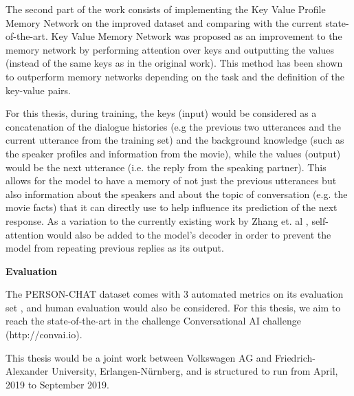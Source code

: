 \documentclass{article}
\begin{document}
	The second part of the work consists of implementing the Key Value Profile Memory Network \cite{miller2016key} on the improved dataset and comparing with the current state-of-the-art. Key Value Memory Network was proposed as an improvement to the memory network by performing attention over keys and outputting the values (instead of the same keys as in the original work). This method has been shown to outperform memory networks depending on the task and the definition of the key-value pairs.
	
	For this thesis, during training, the keys (input) would be considered as a concatenation of the dialogue histories (e.g the previous two utterances and the current utterance from the training set) and the background knowledge (such as the speaker profiles and information from the movie), while the values (output) would be the next utterance (i.e. the reply from the speaking partner). This allows for the model to have a memory of not just the previous utterances but also information about the speakers and about the topic of conversation (e.g. the movie facts) that it can directly use to help influence its prediction of the next response. As a variation to the currently existing work by Zhang et. al \cite{zhang2018personalizing}, self-attention would also be added to the model's decoder \cite{vaswani2017attention,shao2017generating} in order to prevent the model from repeating previous replies as its output.
	
	
	\textbf{Evaluation}
	
	The PERSON-CHAT dataset comes with 3 automated metrics on its evaluation set \cite{zhang2018personalizing}, and human evaluation would also be considered. For this thesis, we aim to reach the state-of-the-art in the challenge Conversational AI challenge (http://convai.io).
	
	This thesis would be a joint work between Volkswagen AG and Friedrich-Alexander University, Erlangen-Nürnberg, and is structured to run from April, 2019 to September 2019. 
	
	
	
	
\end{document}
